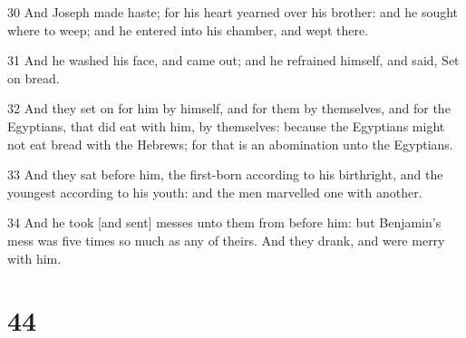 \par 30 And Joseph made haste; for his heart yearned over his brother: and he sought where to weep; and he entered into his chamber, and wept there.
\par 31 And he washed his face, and came out; and he refrained himself, and said, Set on bread.
\par 32 And they set on for him by himself, and for them by themselves, and for the Egyptians, that did eat with him, by themselves: because the Egyptians might not eat bread with the Hebrews; for that is an abomination unto the Egyptians.
\par 33 And they sat before him, the first-born according to his birthright, and the youngest according to his youth: and the men marvelled one with another.
\par 34 And he took [and sent] messes unto them from before him: but Benjamin's mess was five times so much as any of theirs. And they drank, and were merry with him.

\chapter{44}

